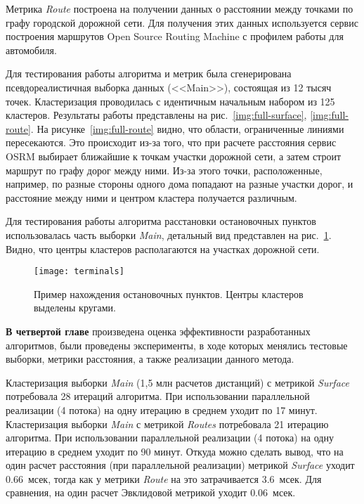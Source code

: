 Метрика \emph{Route} построена на получении данных о расстоянии между точками по графу городской дорожной сети. Для получения этих данных используется сервис построения маршрутов Open Source Routing Machine с профилем работы для автомобиля.

Для тестирования работы алгоритма и метрик была сгенерирована псевдореалистичная выборка данных (<<Main>>), состоящая из 12 тысяч точек. Кластеризация проводилась с идентичным начальным набором из 125 кластеров. Результаты работы представлены на рис.~\ref{img:full-surface}, \ref{img:full-route}. На рисунке~\ref{img:full-route} видно, что области, ограниченные линиями пересекаются. Это происходит из-за того, что при расчете расстояния сервис OSRM выбирает ближайшие к точкам участки дорожной сети, а затем строит маршрут по графу дорог между ними. Из-за этого точки, расположенные, например, по разные стороны одного дома попадают на разные участки дорог, и расстояние между ними и центром кластера получается различным.

Для тестирования работы алгоритма расстановки остановочных пунктов использовалась часть выборки \emph{Main}, детальный вид представлен на рис.~\ref{img:terminals}. Видно, что центры кластеров располагаются на участках дорожной сети.
\begin{figure}[h!]
    \centering
    \texttt{[image: terminals]}\\[1ex]
    \parbox{.9\textwidth}{\caption{Пример нахождения остановочных пунктов. Центры кластеров выделены кругами.} \label{img:terminals}}
\end{figure}

\textbf{В четвертой главе} произведена оценка эффективности разработанных алгоритмов, были проведены эксперименты, в ходе которых менялись тестовые выборки, метрики расстояния, а также реализации данного метода.

Кластеризация выборки \emph{Main} (1,5 млн расчетов дистанций) с метрикой \emph{Surface} потребовала 28 итераций алгоритма. При использовании параллельной реализации (4 потока) на одну итерацию в среднем уходит по 17 минут. Кластеризация выборки \emph{Main} с метрикой \emph{Routes} потребовала 21 итерацию алгоритма. При использовании параллельной реализации (4 потока) на одну итерацию в среднем уходит по 90 минут. Откуда можно сделать вывод, что на один расчет расстояния (при параллельной реализации) метрикой \emph{Surface} уходит \( 0.66 \)~мсек, тогда как у метрики \emph{Route} на это затрачивается \( 3.6 \)~мсек. Для сравнения, на один расчет Эвклидовой метрикой уходит \( 0.06 \)~мсек.

